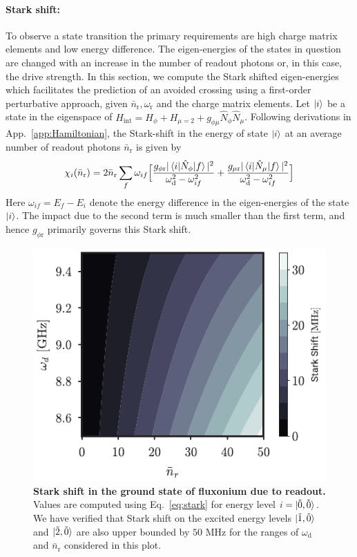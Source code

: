 \documentclass[%
reprint,
superscriptaddress,
 amsmath,amssymb,
 aps,
 prx,
longbibliography,
floatfix,
]{revtex4-2}
\begin{document}
{\paragraph{Stark shift:}\label{app:stark-shift}
To observe a state transition the primary requirements are high charge matrix elements and low energy difference. The eigen-energies of the states in question are changed with an increase in the number of readout photons or, in this case, the drive strength. In this section, we compute the Stark shifted eigen-energies which facilitates the prediction of an avoided crossing using a first-order perturbative approach, given $\bar n_\textrm{r}, \omega_\textrm{r}$ and the charge matrix elements.  Let $\ket{i}$ be a state in the eigenspace of $H_{\textrm{int}}=H_\phi+H_{\mu=2}+g_{\phi\mu}\hat N_\phi\hat N_\mu$. Following derivations in App.~\ref{app:Hamiltonian}, the Stark-shift in the energy of state $\ket{i}$ at an average number of readout photons $\bar n_\textrm{r}$ is given by
\begin{align}
    \chi_i(\bar n_\textrm{r})=2\bar n_\textrm{r}\sum_{f}\omega_{if}\Big[\frac{g_{\phi \textrm{r}}|\braket{i|\hat N_\phi|f}|^2}{\omega_\textrm{d}^2-\omega_{if}^2}+\frac{g_{\mu \textrm{r}}|\braket{i|\hat N_\mu|f}|^2}{\omega_\textrm{d}^2-\omega_{if}^2}\Big]\label{eq:stark}
\end{align}
 Here $\omega_{if}=E_f-E_i$ denote the energy difference in the eigen-energies of the state $\ket{i}$. The impact due to the second term is much smaller than the first term, and hence $g_{\phi \textrm{r}}$ primarily governs this Stark shift.
 \begin{figure}
     \centering
     \includegraphics[width=\linewidth]{Supp_Fig/Stark-shift.pdf}
     \caption{\textbf{Stark shift in the ground state of fluxonium due to readout.} Values are computed using Eq.~\ref{eq:stark} for energy level $i=\ket{\tilde{0},\tilde{0}}$. We have verified that Stark shift on the excited energy levels $\ket{\tilde{1},\tilde{0}}$ and $\ket{\tilde{2},\tilde{0}}$ are also upper bounded by $50$ MHz for the ranges of $\omega_\textrm{d}$ and $ \bar n_\textrm{r}$ considered in this plot.}
     \label{fig:stark-shift}
 \end{figure}

}
\end{document}
